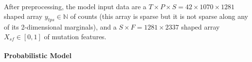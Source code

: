 \documentclass[12pt]{article}
\begin{document}
After preprocessing, the model input data are a $T\times P\times S = 42 \times 1070 \times 1281$ shaped array $y_{tps}\in\mathbb N$ of counts (this array is sparse but it is not sparse along any of its 2-dimensional marginals), and a $S\times F = 1281 \times 2337$ shaped array $X_{sf}\in[0,1]$ of mutation features.

\paragraph*{Probabilistic Model}

% 
\end{document}
